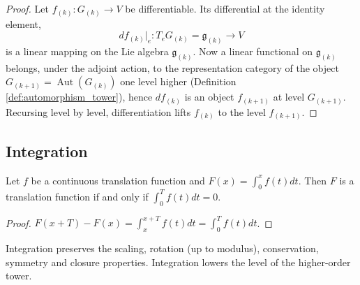\begin{proof}
Let $f_{(k)}:G_{(k)}\to V$ be differentiable. Its differential at the identity element,
\[
df_{(k)}\big|_e:T_eG_{(k)}=\mathfrak{g}_{(k)}\longrightarrow V
\]
is a linear mapping on the Lie algebra $\mathfrak{g}_{(k)}$. Now a linear functional on $\mathfrak{g}_{(k)}$ belongs, under the adjoint action, to the representation category of the object $G_{(k+1)}=\operatorname{Aut}(G_{(k)})$ one level higher (Definition \ref{def:automorphism_tower}), hence $df_{(k)}$ is an object $f_{(k+1)}$ at level $G_{(k+1)}$. Recursing level by level, differentiation lifts $f_{(k)}$ to the level $f_{(k+1)}$.
\end{proof}

\subsection{Integration}

\begin{proposition}\label{prop:int_translation}
Let $f$ be a continuous translation function and $F(x) = \int_0^x f(t) dt$. Then $F$ is a translation function if and only if $\int_0^T f(t) dt = 0$.
\end{proposition}

\begin{proof}
$F(x+T) - F(x) = \int_x^{x+T} f(t) dt = \int_0^T f(t) dt$.
\end{proof}

\begin{proposition}\label{prop:int_all}
Integration preserves the scaling, rotation (up to modulus), conservation, symmetry and closure properties. Integration lowers the level of the higher-order tower.
\end{proposition}

